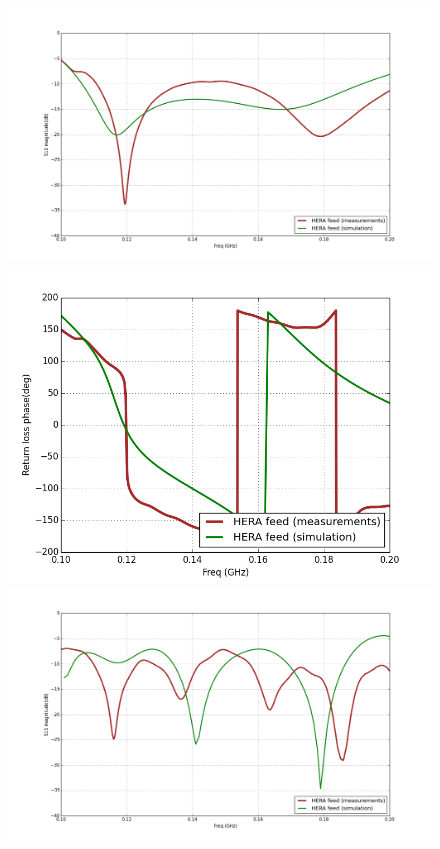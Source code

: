 \documentclass[twocolumn]{emulateapj}
\begin{document}
\begin{figure}[ht]
\begin{minipage}[b]{0.5\linewidth}
\centering
\includegraphics[angle=0, width=\linewidth]{GB_reflectometry_part3/plot/RL_mag_feed.png}
\end{minipage}
\hspace{0.1cm}
\begin{minipage}[b]{0.5\linewidth}
\centering
\includegraphics[angle=0, width=\linewidth]{GB_reflectometry_part3/plot/RL_ph_feed.png}
\end{minipage}
\vspace{0.1cm}  
\begin{minipage}[b]{0.5\linewidth}
\centering
\includegraphics[angle=0, width=\linewidth]{GB_reflectometry_part3/plot/RL_mag_dish.png}

\end{minipage}
\end{figure}
\end{document}
